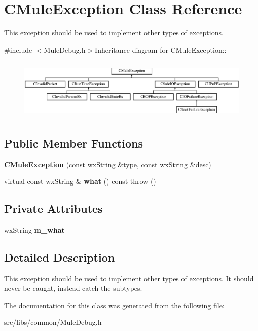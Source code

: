 \section{CMuleException Class Reference}
\label{classCMuleException}


This exception should be used to implement other types of exceptions.  


{\ttfamily \#include $<$MuleDebug.h$>$}Inheritance diagram for CMuleException::\begin{figure}[H]
\begin{center}
\leavevmode
\includegraphics[height=2.94737cm]{classCMuleException}
\end{center}
\end{figure}
\subsection*{Public Member Functions}
\begin{DoxyCompactItemize}
\item 
{\bfseries CMuleException} (const wxString \&type, const wxString \&desc)\label{classCMuleException_a48cd388b3d40495d75392b1c8b5ac0f8}

\item 
virtual const wxString \& {\bfseries what} () const   throw ()\label{classCMuleException_a29db060f7bf8add89c2f6538997c0b15}

\end{DoxyCompactItemize}
\subsection*{Private Attributes}
\begin{DoxyCompactItemize}
\item 
wxString {\bfseries m\_\-what}\label{classCMuleException_a9fc96da18fa4841c9a975e057609b1a2}

\end{DoxyCompactItemize}


\subsection{Detailed Description}
This exception should be used to implement other types of exceptions. It should never be caught, instead catch the subtypes. 

The documentation for this class was generated from the following file:\begin{DoxyCompactItemize}
\item 
src/libs/common/MuleDebug.h\end{DoxyCompactItemize}
